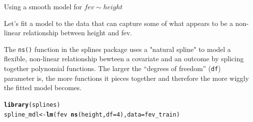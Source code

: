 \documentclass[table]{beamer}\usepackage[]{graphicx}\usepackage[]{color}
\makeatletter
\newcommand{\hlnum}[1]{\textcolor[rgb]{0.686,0.059,0.569}{#1}}%
\newcommand{\hlopt}[1]{\textcolor[rgb]{0,0,0}{#1}}%
\newcommand{\hlstd}[1]{\textcolor[rgb]{0.345,0.345,0.345}{#1}}%
\newcommand{\hlkwb}[1]{\textcolor[rgb]{0.69,0.353,0.396}{#1}}%
\newcommand{\hlkwc}[1]{\textcolor[rgb]{0.333,0.667,0.333}{#1}}%
\newcommand{\hlkwd}[1]{\textcolor[rgb]{0.737,0.353,0.396}{\textbf{#1}}}%
\newenvironment{kframe}{%
 \def\at@end@of@kframe{}%
 \ifinner\ifhmode%
  \def\at@end@of@kframe{\end{minipage}}%
  \begin{minipage}{\columnwidth}%
 \fi\fi%
 \def\FrameCommand##1{\hskip\@totalleftmargin \hskip-\fboxsep
 \colorbox{shadecolor}{##1}\hskip-\fboxsep
     \hskip-\linewidth \hskip-\@totalleftmargin \hskip\columnwidth}%
 \MakeFramed {\advance\hsize-\width
   \@totalleftmargin\z@ \linewidth\hsize
   \@setminipage}}%
 {\par\unskip\endMakeFramed%
 \at@end@of@kframe}
\newenvironment{knitrout}{}{} %
\makeatother
\begin{document}
\begin{frame}[fragile]{Using a smooth model for $fev \sim height$}

Let's fit a model to the data that can capture some of what appears to be a non-linear relationship between height and fev.

The {\tt ns()} function in the splines package uses a "natural spline" to model a flexible, non-linear relationship bewteen a covariate and an outcome by splicing together polynomial functions. The larger the ``degrees of freedom'' ({\tt df}) parameter is, the more functions it pieces together and therefore the more wiggly the fitted model becomes. 

\scriptsize
\begin{knitrout}\footnotesize
{}\color{fgcolor}\begin{kframe}
\begin{alltt}
\hlkwd{library}\hlstd{(splines)}
\hlstd{spline_mdl} \hlkwb{<-} \hlkwd{lm}\hlstd{(fev} \hlopt{~} \hlkwd{ns}\hlstd{(height,} \hlkwc{df} \hlstd{=} \hlnum{4}\hlstd{),} \hlkwc{data}\hlstd{=fev_train)}
\end{alltt}
\end{kframe}
\end{knitrout}

\end{frame}

\end{document}
